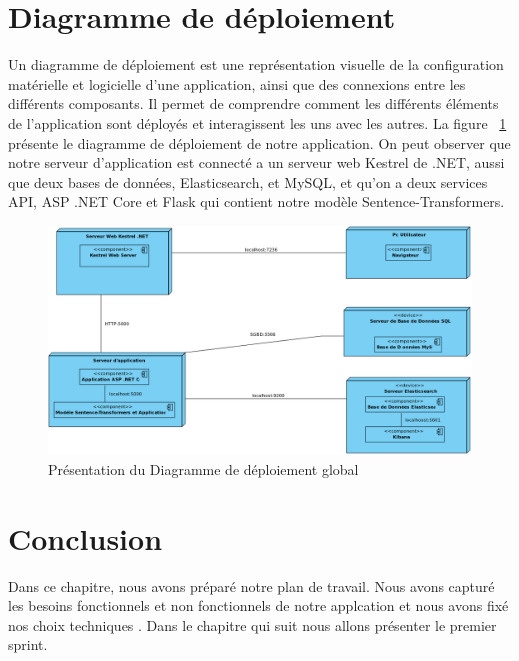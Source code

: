 \newpage
\section{Diagramme de déploiement}
\noindent
Un diagramme de déploiement est une représentation visuelle de la configuration
matérielle et logicielle d'une application, ainsi que des connexions entre les différents composants. Il permet de comprendre comment les différents éléments de l'application sont déployés et interagissent les uns avec les autres. La figure ~\ref{fig:diagdepglobal} présente le diagramme de déploiement de notre application. On peut observer que notre serveur d'application est connecté a un serveur web Kestrel de .NET, aussi que deux bases de données, Elasticsearch, et MySQL, et qu'on a deux services API, ASP .NET Core et Flask qui contient notre modèle Sentence-Transformers.


\begin{figure}[H]
\centering
\includegraphics[width=1\textwidth]{logos/deployment.png}
\caption{Présentation du Diagramme de déploiement global}
\label{fig:diagdepglobal}
\end{figure}


\section{Conclusion}
\noindent
Dans ce chapitre, nous avons préparé notre plan de travail. Nous avons capturé les besoins fonctionnels et non fonctionnels de notre applcation et nous avons fixé nos choix techniques .
Dans le chapitre qui suit nous allons présenter le premier sprint. 
